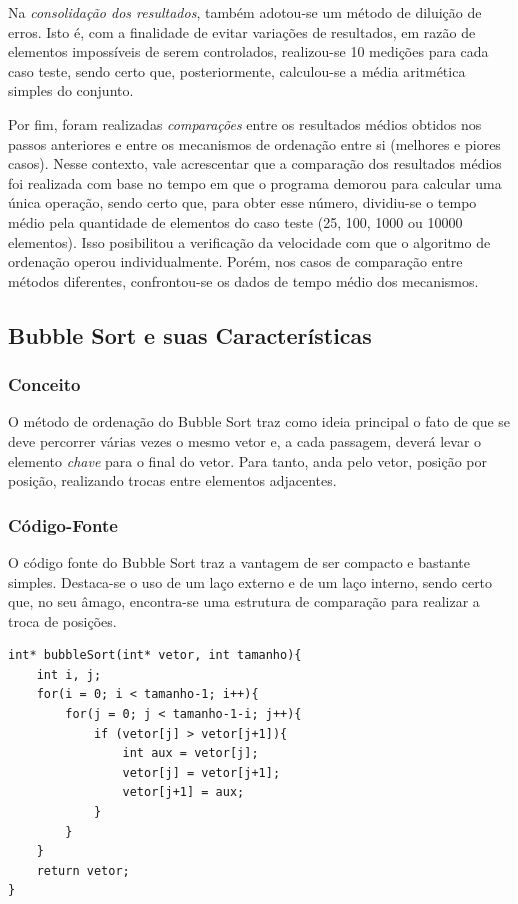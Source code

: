 \documentclass[a4paper, 12pt]{article}
\begin{document}
Na \textit{consolidação dos resultados}, também adotou-se um método de diluição de erros. Isto é, com a finalidade de evitar variações de resultados, em razão de elementos impossíveis de serem controlados, realizou-se 10 medições para cada caso teste, sendo certo que, posteriormente, calculou-se a média aritmética simples do conjunto.

Por fim, foram realizadas \textit{comparações} entre os resultados médios obtidos nos passos anteriores e entre os mecanismos de ordenação entre si (melhores e piores casos). Nesse contexto, vale acrescentar que a comparação dos resultados médios foi realizada com base no tempo em que o programa demorou para calcular uma única operação, sendo certo que, para obter esse número, dividiu-se o tempo médio pela quantidade de elementos do caso teste (25, 100, 1000 ou 10000 elementos). Isso posibilitou a verificação da velocidade com que o algoritmo de ordenação operou individualmente. Porém, nos casos de comparação entre métodos diferentes, confrontou-se os dados de tempo médio dos mecanismos.


\subsection{Bubble Sort e suas Características}

\subsubsection{Conceito}
\tab O método de ordenação do Bubble Sort traz como ideia principal o fato de que se deve percorrer várias vezes o mesmo vetor e, a cada passagem, deverá levar o elemento \textit{chave} para o final do vetor. Para tanto, anda pelo vetor, posição por posição, realizando trocas entre elementos adjacentes.


\subsubsection{Código-Fonte}
\tab{}O código fonte do Bubble Sort traz a vantagem de ser compacto e bastante simples. Destaca-se o uso de um laço externo e de um laço interno, sendo certo que, no seu âmago, encontra-se uma estrutura de comparação para realizar a troca de posições.

\begin{verbatim}
int* bubbleSort(int* vetor, int tamanho){
    int i, j;
    for(i = 0; i < tamanho-1; i++){
        for(j = 0; j < tamanho-1-i; j++){
            if (vetor[j] > vetor[j+1]){
                int aux = vetor[j];
                vetor[j] = vetor[j+1];
                vetor[j+1] = aux;		
            }
        }
    }	
    return vetor;
}
\end{verbatim}
\end{document}

